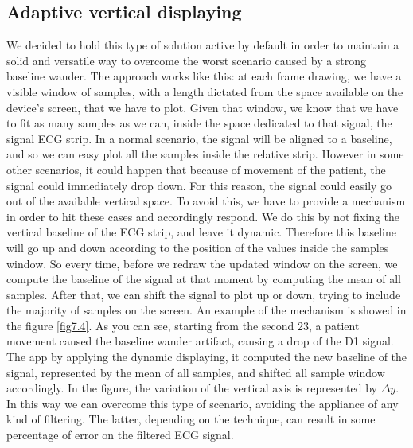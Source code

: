 \subsection{Adaptive vertical displaying}
We decided to hold this type of solution active by default in order to maintain a solid and versatile way to overcome the worst scenario caused by a strong baseline wander. The approach works like this: at each frame drawing, we have a visible window of samples, with a length dictated from the space available on the device's screen, that we have to plot. Given that window, we know that we have to fit as many samples as we can, inside the space dedicated to that signal, the signal ECG strip. In a normal scenario, the signal will be aligned to a baseline, and so we can easy plot all the samples inside the relative strip. However in some other scenarios, it could happen that because of movement of the patient, the signal could immediately drop down. For this reason, the signal could easily go out of the available vertical space. To avoid this, we have to provide a mechanism in order to hit these cases and accordingly respond. We do this by not fixing the vertical baseline of the ECG strip, and leave it dynamic. Therefore this baseline will go up and down according to the position of the values inside the samples window. So every time, before we redraw the updated window on the screen, we compute the baseline of the signal at that moment by computing the mean of all samples. After that, we can shift the signal to plot up or down, trying to include the majority of samples on the screen. An example of the mechanism is showed in the figure \ref{fig7.4}. As you can see, starting from the second 23, a patient movement caused the baseline wander artifact, causing a drop of the D1 signal. The app by applying the dynamic displaying, it computed the new baseline of the signal, represented by the mean of all samples, and shifted all sample window accordingly. In the figure, the variation of the vertical axis is represented by $\Delta y$.\\
In this way we can overcome this type of scenario, avoiding the appliance of any kind of filtering. The latter, depending on the technique, can result in some percentage of error on the filtered ECG signal.
